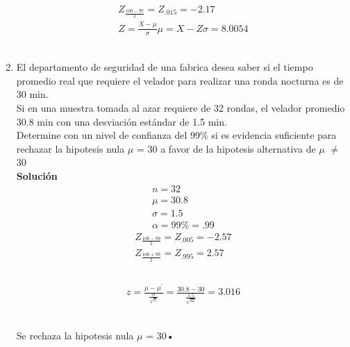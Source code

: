 \begin{enumerate}
    \begin{gather*}	 
    Z_{\frac{100 - 97}{2}} = Z_{.015} = -2.17\\
    Z = \frac{X -\mu}{\sigma}
    \mu = X - Z\sigma = 8.0054
    \end{gather*}\\
    \item El departamento de seguridad de una fabrica desea saber si el tiempo promedio real que requiere el velador para realizar una ronda nocturna es de 30 min.\\
    Si en una muestra tomada al azar requiere de 32 rondas, el velador promedio 30.8 min con una desviación estándar de 1.5 min.\\
    Determine con un nivel de confianza del 99\% si es evidencia suficiente para rechazar la hipotesis nula $\mu$ = 30 a favor de la hipotesis alternativa de $\mu$ $\neq$ 30
    \\\textbf{Solución}
    \begin{gather*}
    n	= 32\\
    \mu = 30.8\\
    \sigma = 1.5\\
    \alpha = 99\% = .99
    \end{gather*}
    \begin{gather*}	 
    Z_{\frac{100 - 99}{2}} = Z_{.005} = -2.57\\
    Z_{\frac{100 + 99}{2}} = Z_{.995} = 2.57\\
    \end{gather*}\\
    \begin{gather*}	 
    z = \frac{\mu - \mu^{'}}{\frac{\sigma}{\sqrt{n}}} = \frac{30.8 - 30}{\frac{1.5}{\sqrt{32}}} = 3.016
    \end{gather*}\\
    \begin{center}
         Se rechaza la hipotesis nula $\mu$ = 30•
    \end{center}
    

\end{enumerate}
